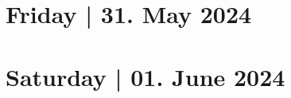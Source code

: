 \documentclass[openany, parskip=full, 12pt, a4]{scrbook}
\begin{document}
\chapter{Friday | 31. May 2024}



\chapter{Saturday | 01. June 2024}




\newpage
\pagecolor{myblue}
\thispagestyle{empty}
\mbox{}
\end{document}
